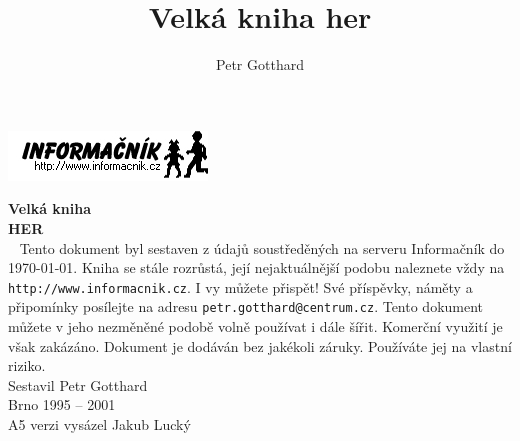 \documentclass[A5paper,8pt,openany,twoside]{book}
\author{Petr Gotthard}
\title{Velká kniha her}
\begin{document}
\pagestyle{empty}%

{\raggedleft
\includegraphics{inflogo}\\[3 cm]
}

{\centering
{
 \fontsize{2 cm}{2.4 cm}%
 \bfseries%
 Velká kniha
}\\[5mm]
{
 \fontsize{5.5 cm}{6.6 cm}%
 \bfseries%
 HER
}\\[8.5cm]
}
\cleardoublepage %
\pagestyle{fancy} %
~
\vfill
Tento dokument byl sestaven z údajů soustředěných na serveru
Informačník do \today. Kniha se stále rozrůstá, její nejaktuálnější
podobu naleznete vždy na
{\tt http://www.informacnik.cz}.
I vy můžete přispět! Své příspěvky, náměty a připomínky posílejte na adresu
{\tt petr.gotthard@centrum.cz}.
Tento dokument můžete v jeho nezměněné podobě volně používat i dále šířit. 
Komerční využití je však zakázáno.
Dokument je dodáván bez jakékoli záruky. Používáte jej na vlastní
riziko.\\[1 cm]

{\centering
Sestavil Petr Gotthard\\
Brno 1995 -- 2001\\
A5 verzi vysázel Jakub Lucký
\\
}

\cleardoublepage

\renewcommand\multicolumntoc{2}
\tableofcontents
\cleardoublepage

\renewcommand\Large{\fontfamily{phv}\fontsize{10}{12}\selectfont}
\renewcommand\large{\fontfamily{phv}\fontsize{7}{8.4}\selectfont}


\newcommand{\nadpis}[2]{%
 \vskip 3ex%
 \addtocounter{#2}{1}%
 \noindent%
 {
  \fontfamily{phv}%
  \fontsize{7}{8.4}%
  \bfseries%
  \arabic{#2}.%
  \hspace{1.5mm}#1%
 }%
 \nopagebreak%
 \vskip 1ex%
}

\newenvironment{intabular}[1]{%
 \noindent%
 \begin{tabular}{#1}%
}{%
 \end{tabular}%
}

\newenvironment{intabularx}[1]{%
 \noindent%
 \tabularx{\columnwidth}{#1}%
}{%
 \endtabularx%
}
\end{document}

